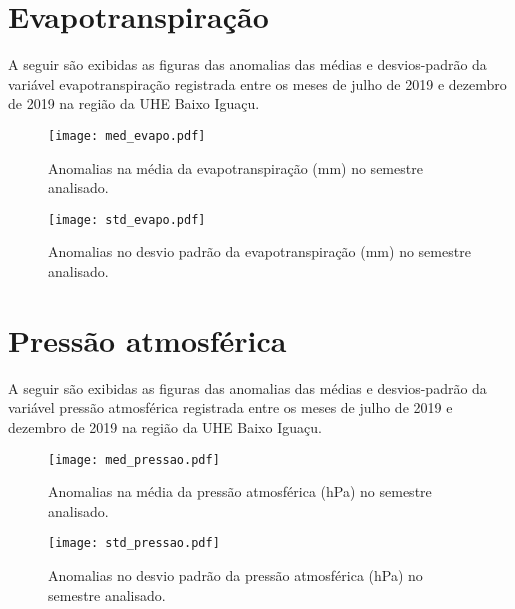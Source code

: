 \documentclass[a4paper,12pt]{article}
\begin{document}
        
        \newpage
        
        \section{Evapotranspiração }
        \hspace{0.5cm} A seguir são exibidas as figuras das anomalias das médias e desvios-padrão da variável evapotranspiração 
        registrada entre os meses de julho de 2019 e dezembro de 2019 na região da UHE Baixo Iguaçu.
        
        \begin{figure}[!htb]
        \centering
        \texttt{[image: med\_evapo.pdf]}
        \caption{Anomalias na média da evapotranspiração (mm) no semestre analisado.}
        \label{fig:figmed_evapo}
        \end{figure}
        
        \begin{figure}[!htb]
        \centering
        \texttt{[image: std\_evapo.pdf]}
        \caption{Anomalias no desvio padrão da evapotranspiração (mm) no semestre analisado.}
        \label{fig:figstd_evapo}
        \end{figure}  
        
        
        \newpage
        
        \section{Pressão atmosférica }
        \hspace{0.5cm} A seguir são exibidas as figuras das anomalias das médias e desvios-padrão da variável pressão atmosférica 
        registrada entre os meses de julho de 2019 e dezembro de 2019 na região da UHE Baixo Iguaçu.
        
        \begin{figure}[!htb]
        \centering
        \texttt{[image: med\_pressao.pdf]}
        \caption{Anomalias na média da pressão atmosférica (hPa) no semestre analisado.}
        \label{fig:figmed_pressao}
        \end{figure}
        
        \begin{figure}[!htb]
        \centering
        \texttt{[image: std\_pressao.pdf]}
        \caption{Anomalias no desvio padrão da pressão atmosférica (hPa) no semestre analisado.}
        \label{fig:figstd_pressao}
        \end{figure}  
        
\end{document}
